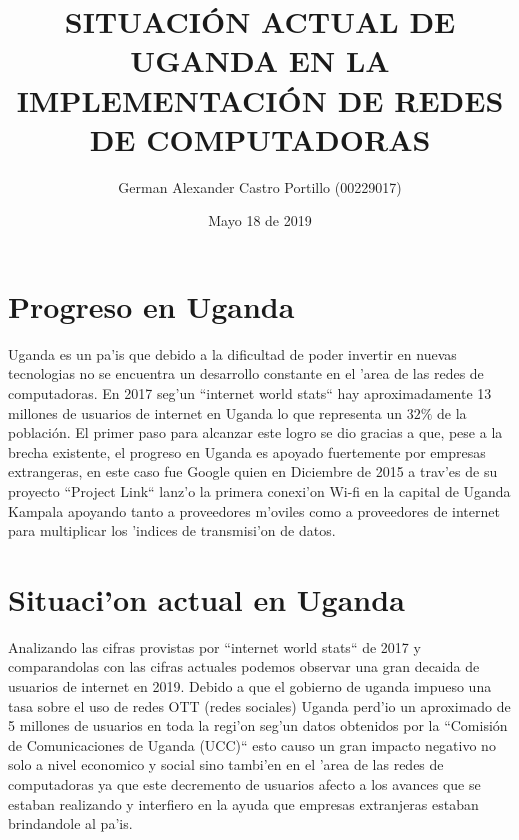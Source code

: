 \documentclass{article}
\title{SITUACI\'ON ACTUAL DE UGANDA EN LA IMPLEMENTACI\'ON DE REDES DE COMPUTADORAS\\}
\author{German Alexander Castro Portillo (00229017)}
\date{Mayo 18 de 2019}
\begin{document}
	\maketitle

	\section{Progreso en Uganda}
		\large{
			Uganda es un pa'is que debido a la dificultad de poder invertir en nuevas tecnologias no se encuentra un desarrollo constante en el 'area de las redes de computadoras. En 2017 seg'un ``internet world stats`` hay aproximadamente 13 millones de usuarios de internet en Uganda lo que representa un $32\%$ de la población. El primer paso para alcanzar este logro se dio gracias a que, pese a la brecha existente, el progreso en Uganda es apoyado fuertemente por empresas extrangeras, en este caso fue Google quien en Diciembre de 2015 a trav'es de su proyecto ``Project Link`` lanz'o la primera conexi'on Wi-fi en la capital de Uganda Kampala apoyando tanto a proveedores m'oviles como a proveedores de internet para multiplicar los 'indices de transmisi'on de datos.    
		}
	\section{Situaci'on actual en Uganda}
		\large{
			Analizando las cifras provistas por ``internet world stats`` de 2017 y comparandolas con las cifras actuales podemos observar una gran decaida de usuarios de internet en 2019. Debido a que el gobierno de uganda impueso una tasa sobre el uso de redes OTT (redes sociales) Uganda perd'io un aproximado de 5 millones de usuarios en toda la regi'on seg'un datos obtenidos por la ``Comisión de Comunicaciones de Uganda (UCC)`` esto causo un gran impacto negativo no solo a nivel economico y social sino tambi'en en el 'area de las redes de computadoras ya que este decremento de usuarios afecto a los avances que se estaban realizando y interfiero en la ayuda que empresas extranjeras estaban brindandole al pa'is.
		}
\end{document}
